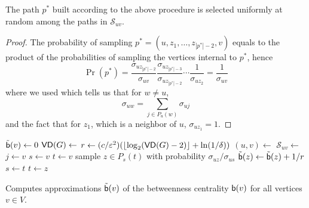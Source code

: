 \begin{lemma}\label{lem:samplpath}
  The path $p^*$ built according to the above procedure is selected uniformly at
  random among the paths in $\mathcal{S}_{uv}$.
\end{lemma}

\begin{proof}
  The probability of sampling $p^*=(u,z_1,\dotsc,z_{|p^*|-2},v)$ equals to the
  product of the probabilities of sampling the vertices internal to $p^*$, hence
  \[
  \Pr(p^*)=\frac{\sigma_{uz_{|p^*|-2}}}{\sigma_{uv}}\frac{\sigma_{uz_{|p^*|-3}}}{\sigma_{uz_{|p^*|-2}}}\dotsb
  \frac{1}{\sigma_{uz_2}}=\frac{1}{\sigma_{uv}}
  \]
  where we used \citep[Lemma3]{Brandes01} which tells us that for $w\neq u$,
  \[
  \sigma_{uw}=\sum_{j\in P_u(w)}\sigma_{uj}
  \]
  and the fact that for $z_1$, which is a neighbor of $u$, $\sigma_{uz_1}=1$.
\end{proof}

\begin{algorithm}[ht]
   \DontPrintSemicolon
  {
  $\tilde{\mathsf{b}}(v)\leftarrow 0$
  }
  $\mathsf{VD}(G)\leftarrow$\label{alg:diamcomp}\; 
  $r\leftarrow (c/\varepsilon^2)(\lfloor\log_2(\mathsf{VD}(G)-2)\rfloor+\ln(1/\delta))$\;
  {\label{algline:forloop}
  $(u,v)\leftarrow$\label{algline:samplevertices}\;
  $\mathcal{S}_{uv}\leftarrow$\label{algline:shortestpaths}\;
  {
  $j\leftarrow v$\;
  $s\leftarrow v$\;
  $t\leftarrow v$\;
   {
  sample $z\in P_s(t)$ with probability $\sigma_{uz}/\sigma_{us}$\;
   {
  $\tilde{\mathsf{b}}(z) \leftarrow \tilde{\mathsf{b}}(z)+1/r$\;
  $s\leftarrow t$\;
  $t\leftarrow z$\;
  }
  }
  }
  } %
  \caption{Computes approximations $\tilde{\mathsf{b}}(v)$ of the betweenness
  centrality $\mathsf{b}(v)$ for all vertices $v\in V$.}
  \label{alg:algorithm}
\end{algorithm}

